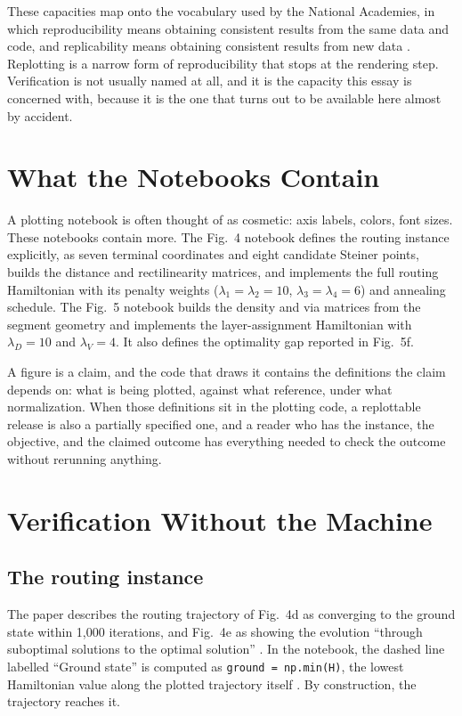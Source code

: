 \documentclass[11pt]{article}
\theoremstyle{definition}
\theoremstyle{remark}
\begin{document}
These capacities map onto the vocabulary used by the National Academies, in which reproducibility means obtaining consistent results from the same data and code, and replicability means obtaining consistent results from new data \cite{nasem2019}. Replotting is a narrow form of reproducibility that stops at the rendering step. Verification is not usually named at all, and it is the capacity this essay is concerned with, because it is the one that turns out to be available here almost by accident.

\section{What the Notebooks Contain}

A plotting notebook is often thought of as cosmetic: axis labels, colors, font sizes. These notebooks contain more. The Fig.~4 notebook defines the routing instance explicitly, as seven terminal coordinates and eight candidate Steiner points, builds the distance and rectilinearity matrices, and implements the full routing Hamiltonian with its penalty weights ($\lambda_1 = \lambda_2 = 10$, $\lambda_3 = \lambda_4 = 6$) and annealing schedule. The Fig.~5 notebook builds the density and via matrices from the segment geometry and implements the layer-assignment Hamiltonian with $\lambda_D = 10$ and $\lambda_V = 4$. It also defines the optimality gap reported in Fig.~5f.

A figure is a claim, and the code that draws it contains the definitions the claim depends on: what is being plotted, against what reference, under what normalization. When those definitions sit in the plotting code, a replottable release is also a partially specified one, and a reader who has the instance, the objective, and the claimed outcome has everything needed to check the outcome without rerunning anything.

\section{Verification Without the Machine}

\subsection*{The routing instance}

The paper describes the routing trajectory of Fig.~4d as converging to the ground state within 1,000 iterations, and Fig.~4e as showing the evolution ``through suboptimal solutions to the optimal solution'' \cite{li2026}. In the notebook, the dashed line labelled ``Ground state'' is computed as \texttt{ground = np.min(H)}, the lowest Hamiltonian value along the plotted trajectory itself \cite{vsimrepo}. By construction, the trajectory reaches it.
\end{document}
